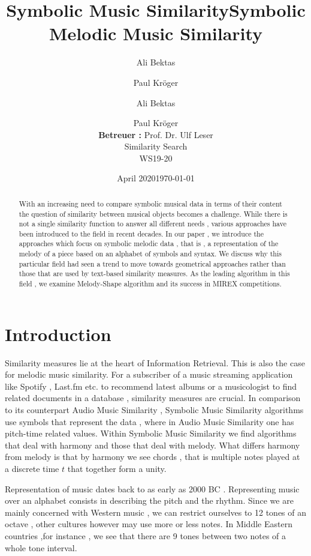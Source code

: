 \documentclass{llncs}
\title{Symbolic Music Similarity}
\author{Ali Bektas \and Paul Kröger}
\date{April 2020}
\title{Symbolic Melodic Music Similarity}
\author{Ali Bektas \and Paul Kröger \\ \textbf{Betreuer :} Prof. Dr. Ulf Leser \\ Similarity Search \\ WS19-20}
\date{\today}
\institute{ \vspace{5px} 
  	Humboldt Universität zu Berlin\\}
\begin{document}
	

	\mainmatter

	\maketitle


	\begin{abstract}
	With an increasing need to compare symbolic musical data in terms of their content 
	the question of similarity between musical objects becomes a challenge. While 
	there is not a single similarity function to answer all different needs , various approaches
	have been introduced to the field in recent decades. In our paper , we introduce the approaches
	which focus on symbolic melodic data , that is , a representation of the melody of a piece based on an alphabet
	of symbols and syntax. We discuss why this particular field had seen a trend to move towards geometrical approaches rather than those that are used by text-based similarity measures. As the leading algorithm in this field , we examine Melody-Shape algorithm and its success in MIREX competitions.
	\end{abstract}

	\section{Introduction}
		Similarity measures lie at the heart of Information Retrieval. This is also the case for melodic music similarity. For a subscriber of a music streaming application like Spotify , Last.fm etc. to recommend latest albums or a musicologist to find related documents in a database , similarity measures are crucial. In comparison to its counterpart Audio Music Similarity , Symbolic Music Similarity algorithms use symbols that represent the data , where in Audio Music Similarity one has pitch-time related values. Within Symbolic Music Similarity we find algorithms that deal with harmony and those that deal with melody. What differs harmony from melody is that by harmony we see chords , that is multiple notes played at a discrete time $t$ that together form a unity.  

		Representation of music dates back to as early as 2000 BC \cite{kil:civ}. Representing music over an alphabet consists in describing the pitch and the rhythm. Since we are mainly concerned with Western music , we can restrict ourselves to 12 tones of an octave , other cultures however may use more or less notes. In Middle Eastern countries ,for instance , we see that there are 9 tones between two notes of a whole tone interval.
\end{document}
